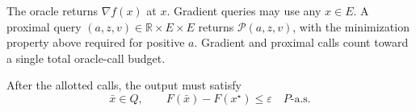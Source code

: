 \documentclass[10pt]{article}
\theoremstyle{definition}
\begin{document}
The oracle returns $\nabla f(x)$ at $x$. Gradient queries may use any $x\in E$. A proximal query $(a,z,v)\in\mathbb{R}\times E\times E$ returns $\mathcal{P}(a,z,v)$, with the minimization property above required for positive $a$. Gradient and proximal calls count toward a single total oracle-call budget.

After the allotted calls, the output must satisfy
\[
\bar{x}\in Q,
\qquad F(\bar{x})-F(x^\star)\leq\varepsilon
\quad P\text{-a.s.}
\]
\end{document}
